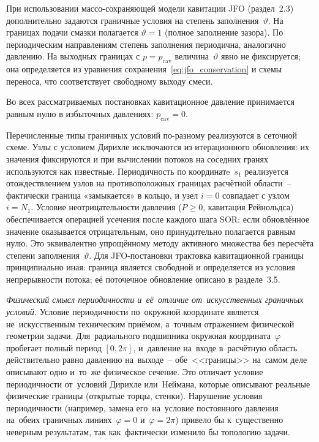 \FloatBarrier

При использовании массо-сохраняющей модели кавитации JFO (раздел~2.3) дополнительно задаются граничные условия на степень заполнения~$\vartheta$. На границах подачи смазки полагается $\vartheta = 1$ (полное заполнение зазора). По периодическим направлениям степень заполнения периодична, аналогично давлению. На выходных границах с $p = p_{\mathrm{cav}}$ величина~$\vartheta$ явно не фиксируется; она определяется из уравнения сохранения~\eqref{eq:jfo_conservation} и схемы переноса, что соответствует свободному выходу смеси.

Во всех рассматриваемых постановках кавитационное давление принимается равным нулю в избыточных давлениях: $p_{\mathrm{cav}} = 0$.

Перечисленные типы граничных условий по-разному реализуются
в сеточной схеме. Узлы с условием Дирихле исключаются
из итерационного обновления: их значения фиксируются
и при вычислении потоков на соседних гранях используются
как известные. Периодичность по координатe~$s_1$ реализуется
отождествлением узлов на противоположных границах расчётной
области~-- фактически граница «замыкается» в кольцо,
и узел $i = 0$ совпадает с узлом $i = N_1$. Условие
неотрицательности давления ($P \geq 0$, кавитация
Рейнольдса) обеспечивается операцией усечения после каждого
шага SOR: если обновлённое значение оказывается отрицательным,
оно принудительно полагается равным нулю. Это эквивалентно
упрощённому методу активного множества без пересчёта степени
заполнения~$\vartheta$. Для JFO-постановки трактовка
кавитационной границы принципиально иная: граница является
свободной и определяется из условия непрерывности потока;
её поточечное обновление описано в разделе~3.5.

\textit{Физический смысл периодичности и~её~отличие от~искусственных граничных условий.}
Условие периодичности по~окружной координате является не~искусственным техническим приёмом, а~точным отражением физической геометрии задачи. Для~радиального подшипника окружная координата~$\varphi$ пробегает полный период $[0, 2\pi]$, и~давление на~входе в~расчётную область действительно равно давлению на~выходе~-- обе~<<границы>> на~самом деле описывают одно и~то~же физическое сечение. Это отличает условие периодичности от~условий Дирихле или~Неймана, которые описывают реальные физические границы (открытые торцы, стенки). Нарушение условия периодичности (например, замена его~на~условие постоянного давления на~обеих граничных линиях~$\varphi = 0$ и~$\varphi = 2\pi$) привело бы к~существенно неверным результатам, так как~фактически изменило бы топологию задачи.

